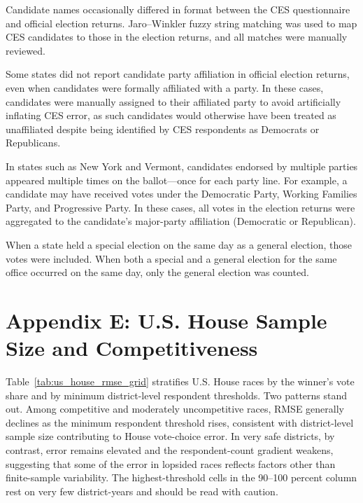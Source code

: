\documentclass[12pt]{article}
\begin{document}
Candidate names occasionally differed in format between the CES questionnaire and official election returns. Jaro–Winkler fuzzy string matching \parencite{jaro_advances_1989, winkler_string_1990} was used to map CES candidates to those in the election returns, and all matches were manually reviewed.

Some states did not report candidate party affiliation in official election returns, even when candidates were formally affiliated with a party. In these cases, candidates were manually assigned to their affiliated party to avoid artificially inflating CES error, as such candidates would otherwise have been treated as unaffiliated despite being identified by CES respondents as Democrats or Republicans.

In states such as New York and Vermont, candidates endorsed by multiple parties appeared multiple times on the ballot—once for each party line. For example, a candidate may have received votes under the Democratic Party, Working Families Party, and Progressive Party. In these cases, all votes in the election returns were aggregated to the candidate’s major-party affiliation (Democratic or Republican).

When a state held a special election on the same day as a general election, those votes were included. When both a special and a general election for the same office occurred on the same day, only the general election was counted.


\section*{Appendix E: U.S. House Sample Size and Competitiveness}
{}
\label{app:us_house_grid}

Table~\ref{tab:us_house_rmse_grid} stratifies U.S. House races by the winner's vote share and by
minimum district-level respondent thresholds. Two patterns stand out. Among competitive and
moderately uncompetitive races, RMSE generally declines as the minimum respondent threshold rises,
consistent with district-level sample size contributing to House vote-choice error. In very safe
districts, by contrast, error remains elevated and the respondent-count gradient weakens, suggesting
that some of the error in lopsided races reflects factors other than finite-sample variability. The
highest-threshold cells in the 90--100 percent column rest on very few district-years and should be
read with caution.
\end{document}
